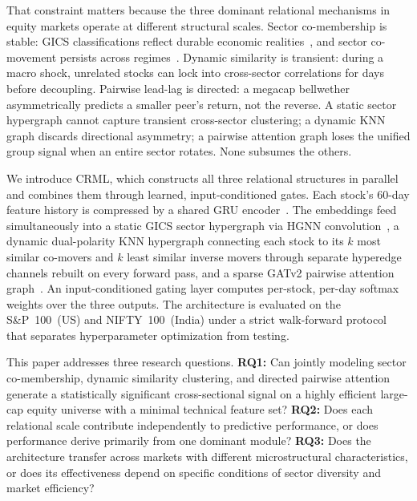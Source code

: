 \documentclass[journal]{IEEEtran}
\begin{document}
That constraint matters because the three dominant relational
mechanisms in equity markets operate at different structural scales.
Sector co-membership is stable: GICS classifications reflect durable
economic realities~\cite{msci2023gics}, and sector co-movement persists
across regimes~\cite{jegadeesh1993returns,gu2020empirical}. Dynamic
similarity is transient: during a macro shock, unrelated stocks can
lock into cross-sector correlations for days before decoupling.
Pairwise lead-lag is directed: a megacap bellwether asymmetrically
predicts a smaller peer's return, not the reverse. A static sector
hypergraph cannot capture transient cross-sector clustering; a dynamic
KNN graph discards directional asymmetry; a pairwise attention graph
loses the unified group signal when an entire sector rotates. None
subsumes the others.

We introduce CRML, which constructs all three relational structures in
parallel and combines them through learned, input-conditioned gates.
Each stock's 60-day feature history is compressed by a shared GRU
encoder~\cite{cho2014learning}. The embeddings feed simultaneously into
a static GICS sector hypergraph via HGNN
convolution~\cite{feng2019hypergraph}, a dynamic dual-polarity KNN
hypergraph connecting each stock to its $k$ most similar co-movers and
$k$ least similar inverse movers through separate hyperedge channels
rebuilt on every forward pass, and a sparse GATv2 pairwise attention
graph~\cite{brody2022attentive}. An input-conditioned gating layer
computes per-stock, per-day softmax weights over the three outputs. The
architecture is evaluated on the S\&P~100~(US) and NIFTY~100~(India)
under a strict walk-forward protocol~\cite{lopezdeprado2018advances}
that separates hyperparameter optimization from testing.

This paper addresses three research questions.
\textbf{RQ1:} Can jointly modeling sector co-membership, dynamic
similarity clustering, and directed pairwise attention generate a
statistically significant cross-sectional signal on a highly efficient
large-cap equity universe with a minimal technical feature set?
\textbf{RQ2:} Does each relational scale contribute independently to
predictive performance, or does performance derive primarily from one
dominant module?
\textbf{RQ3:} Does the architecture transfer across markets with
different microstructural characteristics, or does its effectiveness
depend on specific conditions of sector diversity and market efficiency?
\end{document}
